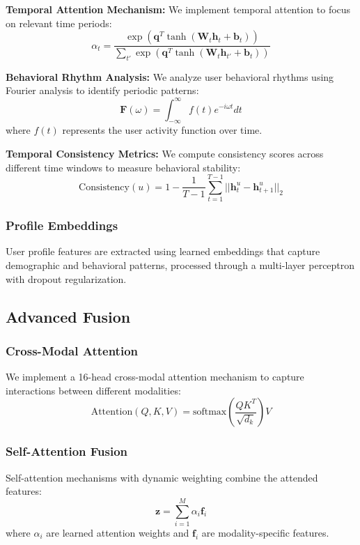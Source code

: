 \documentclass[conference]{IEEEtran}
\begin{document}
\textbf{Temporal Attention Mechanism:} We implement temporal attention to focus on relevant time periods:
\begin{equation}
\alpha_t = \frac{\exp(\mathbf{q}^T \tanh(\mathbf{W}_t \mathbf{h}_t + \mathbf{b}_t))}{\sum_{t'} \exp(\mathbf{q}^T \tanh(\mathbf{W}_t \mathbf{h}_{t'} + \mathbf{b}_t))}
\end{equation}

\textbf{Behavioral Rhythm Analysis:} We analyze user behavioral rhythms using Fourier analysis to identify periodic patterns:
\begin{equation}
\mathbf{F}(\omega) = \int_{-\infty}^{\infty} f(t) e^{-i\omega t} dt
\end{equation}
where $f(t)$ represents the user activity function over time.

\textbf{Temporal Consistency Metrics:} We compute consistency scores across different time windows to measure behavioral stability:
\begin{equation}
\text{Consistency}(u) = 1 - \frac{1}{T-1} \sum_{t=1}^{T-1} ||\mathbf{h}_t^u - \mathbf{h}_{t+1}^u||_2
\end{equation}

\subsubsection{Profile Embeddings}
User profile features are extracted using learned embeddings that capture demographic and behavioral patterns, processed through a multi-layer perceptron with dropout regularization.

\subsection{Advanced Fusion}

\subsubsection{Cross-Modal Attention}
We implement a 16-head cross-modal attention mechanism to capture interactions between different modalities:
\begin{equation}
\text{Attention}(Q, K, V) = \text{softmax}\left(\frac{QK^T}{\sqrt{d_k}}\right)V
\end{equation}

\subsubsection{Self-Attention Fusion}
Self-attention mechanisms with dynamic weighting combine the attended features:
\begin{equation}
\mathbf{z} = \sum_{i=1}^{M} \alpha_i \mathbf{f}_i
\end{equation}
where $\alpha_i$ are learned attention weights and $\mathbf{f}_i$ are modality-specific features.
\end{document}
